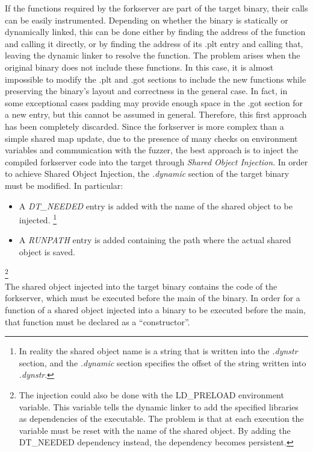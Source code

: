 If the functions required by the forkserver are part of the target binary, their calls can be easily instrumented. 
Depending on whether the binary is statically or dynamically linked, this can be done either by finding the address 
of the function and calling it directly, or by finding the address of its .plt entry and calling that, 
leaving the dynamic linker to resolve the function. 
The problem arises when the original binary does not include these functions. 
In this case, it is almost impossible to modify the .plt and .got sections to include the new functions 
while preserving the binary's layout and correctness in the general case. In fact, in some exceptional cases 
padding may provide enough space in the .got section for a new entry, but this cannot be assumed in general. 
Therefore, this first approach has been completely discarded.
Since the forkserver is more complex than a simple shared map update, due to the presence of many checks on 
environment variables and communication with the fuzzer, 
the best approach is to inject the compiled forkserver code into the target through \textit{Shared Object Injection}.
In order to achieve Shared Object Injection, the \textit{.dynamic} section of the target binary must be modified.
In particular:
\begin{itemize}
    \item A \textit{DT\_NEEDED} entry is added with the name of the shared object to be injected. \footnote{In reality 
        the shared object name is a string that is written into the \textit{.dynstr} section, and the 
        \textit{.dynamic} section specifies the offset of the string written into \textit{.dynstr}.}
    \item A \textit{RUNPATH} entry is added containing the path where the actual shared object is saved.
\end{itemize}
\footnote{
    The injection could also be done with the LD\_PRELOAD environment variable. 
    This variable tells the dynamic linker to add the specified libraries as dependencies of the executable.
    The problem is that at each execution the variable must be reset with the name of the shared object.
    By adding the DT\_NEEDED dependency instead, the dependency becomes persistent.
}\\
The shared object injected into the target binary contains the code of the forkserver, which must be executed 
before the main of the binary.
In order for a function of a shared object injected into a binary to be executed before the main, 
that function must be declared as a ``constructor''.

